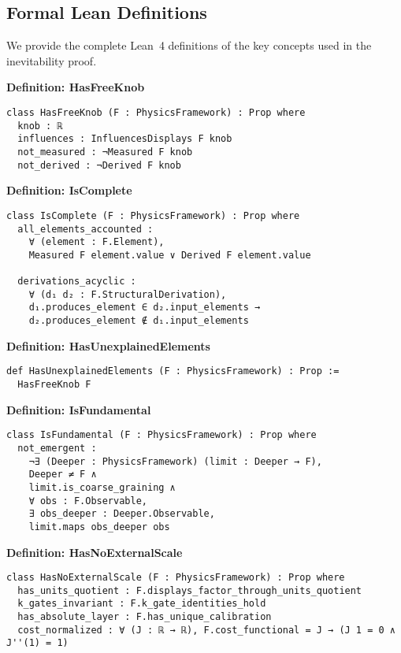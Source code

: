 \documentclass[12pt]{article}
\theoremstyle{remark}
\begin{document}
\begin{appendix}

\section{Formal Lean Definitions}\label{app:definitions}

We provide the complete Lean~4 definitions of the key concepts used in the inevitability proof.

\textbf{Definition: HasFreeKnob}
\begin{verbatim}
class HasFreeKnob (F : PhysicsFramework) : Prop where
  knob : ℝ
  influences : InfluencesDisplays F knob
  not_measured : ¬Measured F knob
  not_derived : ¬Derived F knob
\end{verbatim}

\textbf{Definition: IsComplete}
\begin{verbatim}
class IsComplete (F : PhysicsFramework) : Prop where
  all_elements_accounted :
    ∀ (element : F.Element),
    Measured F element.value ∨ Derived F element.value
  
  derivations_acyclic :
    ∀ (d₁ d₂ : F.StructuralDerivation),
    d₁.produces_element ∈ d₂.input_elements →
    d₂.produces_element ∉ d₁.input_elements
\end{verbatim}

\textbf{Definition: HasUnexplainedElements}
\begin{verbatim}
def HasUnexplainedElements (F : PhysicsFramework) : Prop :=
  HasFreeKnob F
\end{verbatim}

\textbf{Definition: IsFundamental}
\begin{verbatim}
class IsFundamental (F : PhysicsFramework) : Prop where
  not_emergent :
    ¬∃ (Deeper : PhysicsFramework) (limit : Deeper → F),
    Deeper ≠ F ∧
    limit.is_coarse_graining ∧
    ∀ obs : F.Observable,
    ∃ obs_deeper : Deeper.Observable,
    limit.maps obs_deeper obs
\end{verbatim}

\textbf{Definition: HasNoExternalScale}
\begin{verbatim}
class HasNoExternalScale (F : PhysicsFramework) : Prop where
  has_units_quotient : F.displays_factor_through_units_quotient
  k_gates_invariant : F.k_gate_identities_hold
  has_absolute_layer : F.has_unique_calibration
  cost_normalized : ∀ (J : ℝ → ℝ), F.cost_functional = J → (J 1 = 0 ∧ J''(1) = 1)
\end{verbatim}


\end{appendix}
\end{document}
